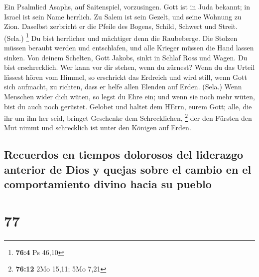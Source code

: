  Ein Psalmlied Asaphs, auf Saitenspiel, vorzusingen.
 Gott ist in Juda bekannt; in Israel ist sein Name
herrlich.  Zu Salem ist sein Gezelt, und seine Wohnung zu
Zion.  Daselbst zerbricht er die Pfeile des Bogens,
Schild, Schwert und Streit. (Sela.) \footnote{\textbf{76:4} Ps 46,10}
 Du bist herrlicher und mächtiger denn die Raubeberge.
 Die Stolzen müssen beraubt werden und entschlafen, und
alle Krieger müssen die Hand lassen sinken.  Von deinem
Schelten, Gott Jakobs, sinkt in Schlaf Ross und Wagen.  Du
bist erschrecklich. Wer kann vor dir stehen, wenn du zürnest?
 Wenn du das Urteil lässest hören vom Himmel, so
erschrickt das Erdreich und wird still,  wenn Gott sich
aufmacht, zu richten, dass er helfe allen Elenden auf Erden. (Sela.)
 Wenn Menschen wider dich wüten, so legst du Ehre ein;
und wenn sie noch mehr wüten, bist du auch noch gerüstet.
 Gelobet und haltet dem HErrn, eurem Gott; alle, die ihr
um ihn her seid, bringet Geschenke dem Schrecklichen, \footnote{\textbf{76:12}
  2Mo 15,11; 5Mo 7,21}  der den Fürsten den Mut nimmt und
schrecklich ist unter den Königen auf Erden.

\hypertarget{recuerdos-en-tiempos-dolorosos-del-liderazgo-anterior-de-dios-y-quejas-sobre-el-cambio-en-el-comportamiento-divino-hacia-su-pueblo}{%
\subsection{Recuerdos en tiempos dolorosos del liderazgo anterior de
Dios y quejas sobre el cambio en el comportamiento divino hacia su
pueblo}\label{recuerdos-en-tiempos-dolorosos-del-liderazgo-anterior-de-dios-y-quejas-sobre-el-cambio-en-el-comportamiento-divino-hacia-su-pueblo}}

\hypertarget{section-76}{%
\section{77}\label{section-76}}

